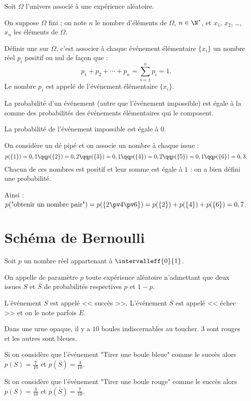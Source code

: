 \documentclass[10pt,openright,twoside,french]{book}
\begin{document}
\begin{Defi}
Soit $\Omega$ l'univers associé à une expérience aléatoire.\par
On suppose $\Omega$ fini ; on note $n$ le nombre d'éléments de $\Omega$, $n \in \N^*$, et $x_1$, $x_2$, \ldots , $x_n$ les éléments de $\Omega$.\par
Définir une  sur $\Omega$, c'est associer à chaque événement élémentaire $\{x_i\}$ un nombre réel $p_i$ positif ou nul de façon que :
\[p_1 + p_2 + \cdots + p_n = \sum_{i=1}^n p_i = 1.\]
Le nombre $p_i$ est appelé  de l'événement élémentaire $\{x_i\}$.\par
La probabilité d'un événement (autre que l'événement impossible) est égale à la somme des probabilités des événements élémentaires qui le composent.\par
La probabilité de l'événement impossible est égale à $0$. 
\end{Defi}

\begin{Exemple}
    On considère un dé pipé et on associe un nombre à chaque issue :
    \[p(\{1\}) = 0,1 \qq p(\{2\}) = 0,2 \qq p(\{3\}) = 0,1 \qq p(\{4\}) = 0,2 \qq p(\{5\}) = 0,1 \qq p(\{6\}) = 0,3.\]
    Chacun de ces nombres est positif et leur somme est égale à $1$ : on a bien défini une probabilité.\par
    Ainsi : $p(\text{"obtenir un nombre pair"}) = p(\{2\pv4\pv6\}) =  p(\{2\}) + p(\{4\}) + p(\{6\}) = 0,7$.
\end{Exemple}

\section{Schéma de Bernoulli}

\begin{Defi}
    Soit $p$ un nombre réel appartenant à $\intervalleff{0}{1}$.\par
    On appelle  de paramètre $p$ toute expérience aléatoire n'admettant que deux issues $S$ et $\overline S$ de probabilités respectives $p$ et $1-p$.\par
    L'événement $S$ est appelé << succès >>. L'événement $\overline S$ est appelé << échec >> et on le note parfois $E$.
\end{Defi}

\begin{Exemple}
    Dans une urne opaque, il y a $10$ boules indiscernables au toucher. $3$ sont rouges et les autres sont bleues.\par
    Si on considère que l'événement "Tirer une boule bleue" comme le succès alors $p(S) = \frac{7}{10}$ et $p(\overline S) = \frac{3}{10}$.\par
    Si on considère que l'événement "Tirer une boule rouge" comme le succès alors $p(S) = \frac{3}{10}$ et $p(\overline S) = \frac{7}{10}$.
\end{Exemple}
\end{document}
